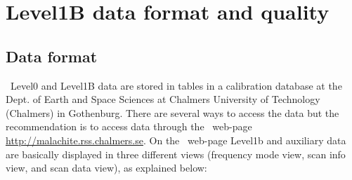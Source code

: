 
\chapter{Level1B data format and quality}


\section{Data format}

\smr\ Level0 and Level1B data are stored in tables
in a calibration database at the Dept. of Earth and Space
Sciences at Chalmers University of Technology (Chalmers) in Gothenburg.
There are several ways to access the data but the recommendation is to access
data through the \smr\ web-page \url{http://malachite.rss.chalmers.se}. 
On the \smr\ web-page Level1b and auxiliary data are basically displayed in three different
views (frequency mode view, scan info view, and scan data view), as explained below:
